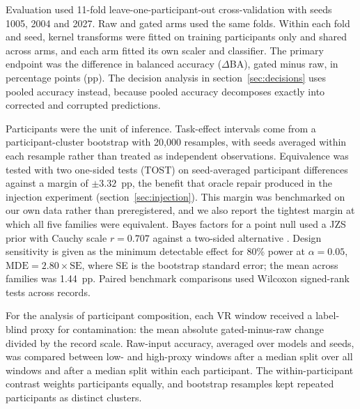 \documentclass[10pt,twocolumn]{article}
\makeatletter
\renewcommand\subsection{\@startsection{subsection}{2}{\z@}{-2ex plus -0.5ex minus -0.2ex}{0.8ex plus 0.2ex}{\normalfont\normalsize\bfseries}}
\newcommand{\pp}{~pp}
\makeatother
\begin{document}
Evaluation used 11-fold leave-one-participant-out cross-validation with seeds 1005, 2004 and 2027. Raw and gated arms used the same folds. Within each fold and seed, kernel transforms were fitted on training participants only and shared across arms, and each arm fitted its own scaler and classifier. The primary endpoint was the difference in balanced accuracy ($\Delta$BA), gated minus raw, in percentage points (pp). The decision analysis in section~\ref{sec:decisions} uses pooled accuracy instead, because pooled accuracy decomposes exactly into corrected and corrupted predictions.

\subsection{Statistics}
Participants were the unit of inference. Task-effect intervals come from a participant-cluster bootstrap with 20,000 resamples, with seeds averaged within each resample rather than treated as independent observations. Equivalence was tested with two one-sided tests (TOST) on seed-averaged participant differences against a margin of $\pm3.32$\pp, the benefit that oracle repair produced in the injection experiment (section~\ref{sec:injection}). This margin was benchmarked on our own data rather than preregistered, and we also report the tightest margin at which all five families were equivalent. Bayes factors for a point null used a JZS prior with Cauchy scale $r=0.707$ against a two-sided alternative \citep{rouder2009bayest}. Design sensitivity is given as the minimum detectable effect for 80\% power at $\alpha=0.05$, $\mathrm{MDE}=2.80\times\mathrm{SE}$, where SE is the bootstrap standard error; the mean across families was 1.44\pp. Paired benchmark comparisons used Wilcoxon signed-rank tests across records.

For the analysis of participant composition, each VR window received a label-blind proxy for contamination: the mean absolute gated-minus-raw change divided by the record scale. Raw-input accuracy, averaged over models and seeds, was compared between low- and high-proxy windows after a median split over all windows and after a median split within each participant. The within-participant contrast weights participants equally, and bootstrap resamples kept repeated participants as distinct clusters.
\end{document}
